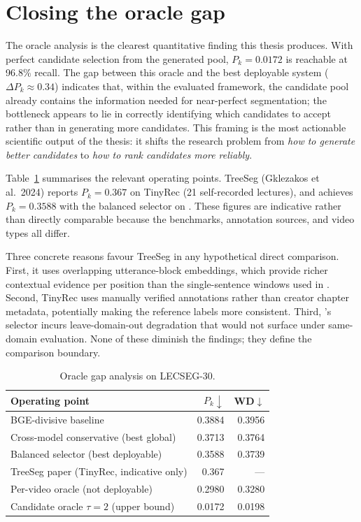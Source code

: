 \section{Closing the oracle gap}
\label{sec:oracle_gap_discussion}

The oracle analysis is the clearest quantitative finding this thesis produces.
With perfect candidate selection from the generated pool, $P_k=0.0172$ is
reachable at 96.8\% recall.
The gap between this oracle and the best deployable system
($\Delta P_k \approx 0.34$) indicates that, within the evaluated framework,
the candidate pool already contains the information needed for near-perfect
segmentation; the bottleneck appears to lie in correctly identifying which
candidates to accept rather than in generating more candidates.
This framing is the most actionable scientific output of the thesis: it shifts
the research problem from \emph{how to generate better candidates} to
\emph{how to rank candidates more reliably}.

Table~\ref{tab:oracle_gap} summarises the relevant operating points.
TreeSeg (Gklezakos et al.\ 2024) reports $P_k=0.367$ on TinyRec (21
self-recorded lectures), and \lecseg{} achieves $P_k=0.3588$ with the balanced
selector on \dataset{}.
These figures are indicative rather than directly comparable because the
benchmarks, annotation sources, and video types all differ.

Three concrete reasons favour TreeSeg in any hypothetical direct comparison.
First, it uses overlapping utterance-block embeddings, which provide
richer contextual evidence per position than the single-sentence windows used
in \lecseg{}.
Second, TinyRec uses manually verified annotations rather than creator
chapter metadata, potentially making the reference labels more consistent.
Third, \lecseg{}'s selector incurs leave-domain-out degradation that would
not surface under same-domain evaluation.
None of these diminish the \lecseg{} findings; they define the comparison boundary.

\begin{table}[h]
  \centering
  \caption{Oracle gap analysis on LECSEG-30.}
  \label{tab:oracle_gap}
  \begin{tabular}{lrr}
    \toprule
    Operating point & $P_k\downarrow$ & WD$\downarrow$ \\
    \midrule
    BGE-divisive baseline & 0.3884 & 0.3956 \\
    Cross-model conservative (best global) & 0.3713 & 0.3764 \\
    Balanced selector (best deployable) & 0.3588 & 0.3739 \\
    TreeSeg paper (TinyRec, indicative only) & 0.367 & --- \\
    Per-video oracle (not deployable) & 0.2980 & 0.3280 \\
    Candidate oracle $\tau=2$ (upper bound) & 0.0172 & 0.0198 \\
    \bottomrule
  \end{tabular}
\end{table}

